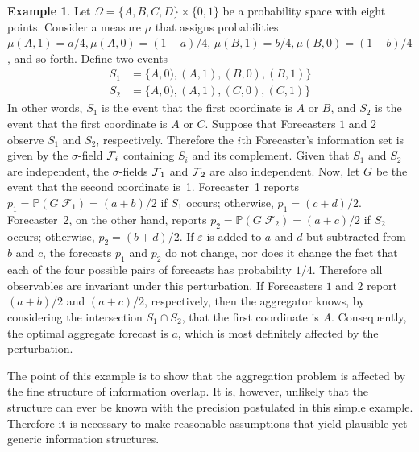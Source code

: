 \documentclass[11pt]{article}
\renewcommand{\P}{\mathbb{P}}
\theoremstyle{definition}
\newtheorem{example}[theorem]{Example}
\theoremstyle{definition}
\def\F{{\cal F}}
\def\P{{\mathbb P}}
\def\ee{\varepsilon}
\begin{document}
\begin{example}
Let $\Omega = \{ A,B,C,D \} \times \{ 0,1 \}$ be a probability space
with eight points.  Consider a measure $\mu$ that assigns
probabilities $\mu (A,1) = a/4, \mu (A,0) = (1-a)/4$, $\mu (B,1) =
b/4, \mu (B,0) = (1-b)/4$, and so forth. Define two events
\begin{align*}
 S_1 &= \{A,0),(A,1),(B,0),(B,1) \}\\
 S_2 &= \{A,0),(A,1),(C,0),(C,1) \}
\end{align*}
In other words, $S_1$ is the event that the first coordinate is
$A$ or $B$, and $S_2$ is the event that the first coordinate
is $A$ or $C$. Suppose that Forecasters $1$ and $2$ observe $S_1$
and $S_2$, respectively. Therefore the $i$th Forecaster's information set is
given by the $\sigma$-field $\F_i$ containing $S_i$ and its
complement. Given that $S_1$ and $S_2$ are independent, the $\sigma$-fields $\F_1$ and $\F_2$ are also independent. Now, let
$G$ be the event that the second coordinate is~1.  Forecaster~1
reports $p_1 = \P(G | \mathcal{F}_1) = (a+b)/2$ if $S_1$ occurs;
otherwise, $p_1 = (c+d)/2$.  Forecaster~2, on the other hand, reports
$p_2 = \P(G | \mathcal{F}_2) = (a+c)/2$ if $S_2$ occurs; otherwise,
$p_2 = (b+d)/2$.  If $\ee$ is added to $a$ and $d$ but subtracted from
$b$ and $c$, the forecasts $p_1$ and $p_2$ do not change, nor does it
change the fact that each of the four possible pairs of forecasts has
probability $1/4$.  Therefore all observables are invariant under
this perturbation.  If Forecasters $1$ and $2$ report $(a+b)/2$ and
$(a+c)/2$, respectively, then the aggregator knows, by considering the
intersection $S_1 \cap S_2$, that the first coordinate is $A$.
Consequently, the optimal aggregate forecast is $a$, which is most
definitely affected by the perturbation.
\end{example}

The point of this example is to show that the aggregation problem is affected
by the fine structure of information overlap.  It is, however, unlikely
that the structure can ever be known with the precision postulated in
this simple example.  Therefore it is necessary to make reasonable
assumptions that yield plausible yet generic information structures.
\end{document}
